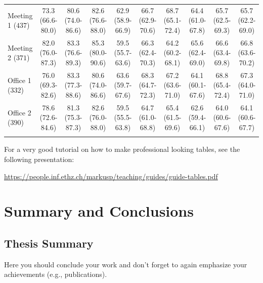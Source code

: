 \documentclass[a4paper,12pt,twoside,openany]{book}
\newif\ifthesis
\newif\ifproposal
\begin{document}
\begin{table}[h]
{\begin{tabular}{l ccc ccc ccc}
      Meeting  1 ($437$) & 73.3 (66.6-80.0) & 80.6 (74.0-86.6) & 82.6 (76.6-88.0) & 62.9 (58.9-66.9) & 66.7 (62.9-70.6) & 68.7 (65.1-72.4)  & 64.4 (61.0-67.8) & 65.7 (62.5-69.3) & 65.7 (62.2-69.0)    \\
      Meeting  2 ($371$) & 82.0 (76.0-87.3) & 83.3 (76.6-89.3) & 85.3 (80.0-90.6) & 59.5 (55.7-63.6) & 66.3 (62.4-70.3) & 64.2 (60.2-68.1) & 65.6 (62.4-69.0) & 66.6 (63.4-69.8) & 66.8 (63.6-70.2)  \\
      Office 1 ($332$) & 76.0 (69.3-82.6) & 83.3 (77.3-88.6) & 80.6 (74.0-86.6) & 63.6 (59.7-67.6) & 68.3 (64.7-72.3)  & 67.2 (63.6-71.0) & 64.1 (60.1-67.6) & 68.8 (65.4-72.4) & 67.3 (64.0-71.0)         \\
      Office 2 ($390$) & 78.6 (72.6-84.6) & 81.3 (75.3-87.3) & 82.6 (76.0-88.0) & 59.5 (55.5-63.8) & 64.7 (61.0-68.8)  & 65.4 (61.5-69.6) & 62.6 (59.4-66.1) & 64.0 (60.6-67.6) & 64.1 (60.6-67.7)       \\       
      \bottomrule
       \label{tbl:ACE_results_SER}
    \end{tabular}
    }
\end{table}

    
    For a very good tutorial on how to make professional looking tables, see the following presentation:

    \url{https://people.inf.ethz.ch/markusp/teaching/guides/guide-tables.pdf}
    
\color{black}









\ifproposal
    \chapter{Preliminary Results}
    \color{teal}
        Optionally, include some preliminary results here.
    \color{black}
    \clearpage
\fi


\ifthesis
    \chapter{Summary and Conclusions}
    \label{sec_conclusions}
    \color{teal}
        \section{Thesis Summary}
            Here you should conclude your work and don't forget to again emphasize your achievements (e.g., publications). 
\end{document}

